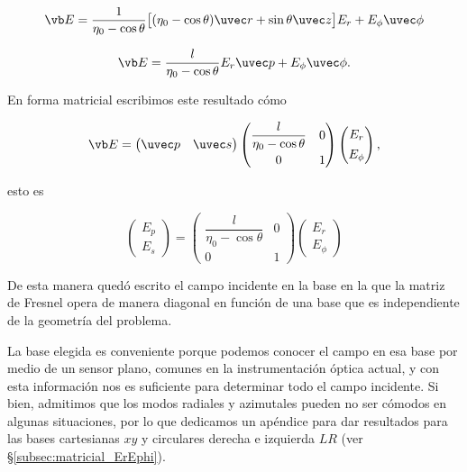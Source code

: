 \begin{equation}
    \vb E = \frac{1}{\eta_0 - \cos\theta} \big[ (\eta_0 - \cos\theta)\uvec r + \sin\theta \uvec z  \big] E_r + E_\phi \uvec \phi
\end{equation}


\begin{equation}
    \vb E = \frac{l}{\eta_0 - \cos\theta} E_r \uvec p + E_\phi \uvec \phi.
    \label{eq:permisible_incident_field_given_Er_Ephi}
\end{equation}

En forma matricial escribimos este resultado cómo 


\begin{equation}
\vb E = 
\begin{pmatrix}
\uvec p & \uvec s
\end{pmatrix}
\begin{pmatrix}
\dfrac{l}{\eta_0 - \cos\theta} & 0 \\[8pt]
0 & 1
\end{pmatrix}
\begin{pmatrix}
E_r \\[4pt]
E_\phi
\end{pmatrix}, 
\end{equation}

esto es 

\begin{equation}
\begin{pmatrix}
E_p \\[4pt]
E_s
\end{pmatrix}
=
\begin{pmatrix}
\dfrac{l}{\eta_0 - \cos\theta} & 0 \\[4pt]
0 & 1
\end{pmatrix}
\begin{pmatrix}
E_r \\[4pt]
E_\phi
\end{pmatrix}
\end{equation}

De esta manera quedó escrito el campo incidente en la base en la que la matriz de Fresnel opera de manera diagonal en función de una base que es independiente de la geometría del problema. 

La base elegida es conveniente porque podemos conocer el campo en esa base por medio de un sensor plano, comunes en la instrumentación óptica actual, y con esta información nos es suficiente para determinar todo el campo incidente. Si bien, admitimos que los modos radiales y azimutales pueden no ser cómodos en algunas situaciones, por lo que dedicamos un apéndice para dar resultados para las bases cartesianas $xy$ y circulares derecha e izquierda $LR$ (ver \S\ref{subsec:matricial_ErEphi}).

